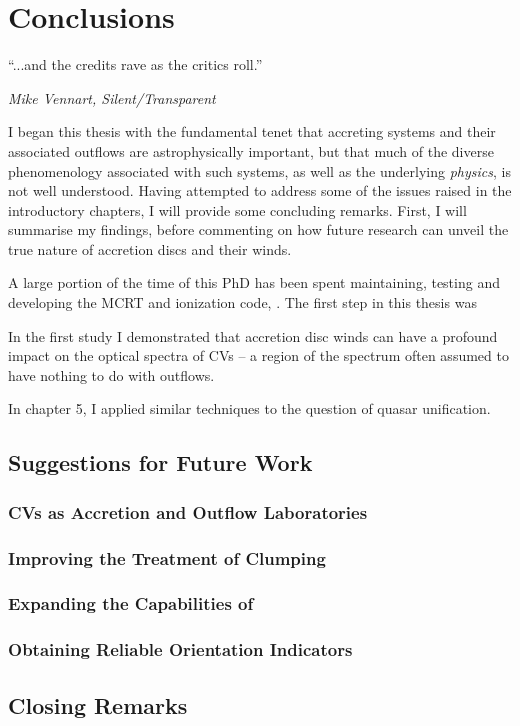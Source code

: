 \chapter{Conclusions}

\epigraph{``...and the credits rave as the critics roll.''}
{{\sl Mike Vennart, Silent/Transparent}}

I began this thesis with the fundamental tenet that accreting systems
and their associated outflows are astrophysically important, but that
much of the diverse phenomenology associated with such systems, as well
as the underlying {\em physics}, is not well understood.  
Having attempted to address some of the issues raised in the 
introductory chapters, I will provide some concluding remarks. 
First, I will summarise my findings, before 
commenting on how future research can unveil the true nature of 
accretion discs and their winds.

A large portion of the time of this PhD has been spent maintaining,
testing and developing the MCRT and ionization code, \py. The first 
step in this thesis was 



In the first study I demonstrated that accretion disc winds
can have a profound impact on the optical spectra of CVs -- a region
of the spectrum often assumed to have nothing to do with outflows.

In chapter 5, I applied similar techniques to the question of quasar 
unification.

\section{Suggestions for Future Work}

\subsection{CVs as Accretion and Outflow Laboratories}

\subsection{Improving the Treatment of Clumping}

\subsection{Expanding the Capabilities of \py}

\subsection{Obtaining Reliable Orientation Indicators}

\section{Closing Remarks}












